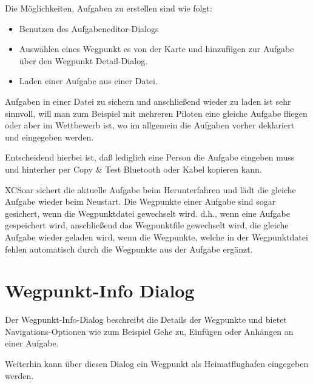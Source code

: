 Die Möglichkeiten, Aufgaben zu erstellen sind wie folgt:
\begin{itemize}
\item Benutzen des Aufgabeneditor-Dialogs
\item Auswählen eines Wegpunkt es von der Karte und hinzufügen zur Aufgabe über den Wegpunkt Detail-Dialog.
\item Laden einer Aufgabe aus einer Datei.
\end{itemize}

\tip Aufgaben in einer Datei zu sichern und anschließend wieder zu laden ist sehr sinnvoll,  will man zum Beispiel mit mehreren Piloten eine gleiche Aufgabe fliegen oder aber im Wettbewerb ist, wo im  allgemein die Aufgaben vorher deklariert und eingegeben werden.

Entscheidend hierbei ist, daß lediglich eine Person die Aufgabe eingeben muss und hinterher per Copy \& Test Bluetooth oder Kabel kopieren kann.

\textsf{XCSoar} sichert die aktuelle Aufgabe beim Herunterfahren und lädt die gleiche Aufgabe wieder beim Neustart.  Die Wegpunkte einer Aufgabe sind sogar gesichert, wenn die Wegpunktdatei gewechselt wird. d.h., wenn eine Aufgabe gespeichert wird, anschließend das Wegpunktfile gewechselt wird, die gleiche Aufgabe wieder geladen  wird, wenn die Wegpunkte, welche in der Wegpunktdatei  fehlen automatisch durch die Wegpunkte aus der Aufgabe ergänzt.

\section{Wegpunkt-Info Dialog}

Der Wegpunkt-Info-Dialog beschreibt die Details der Wegpunkte  und bietet Navigations-Optionen wie zum Beispiel \textsf{Gehe zu}, \textsf{Einfügen} oder \textsf{Anhängen} an einer Aufgabe.

Weiterhin kann über diesen Dialog ein Wegpunkt als Heimatflughafen eingegeben werden.

